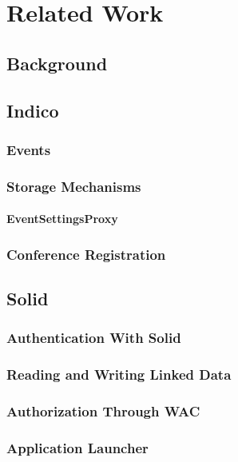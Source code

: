 \chapter{Related Work}
\setcounter{section}{0}

\section{Background}

\section{Indico}

\subsection{Events}

\subsection{Storage Mechanisms}

\subsubsection{EventSettingsProxy}

\subsection{Conference Registration}

\section{Solid}

\subsection{Authentication With Solid}

\subsection{Reading and Writing Linked Data}

\subsection{Authorization Through WAC}

\subsection{Application Launcher}
